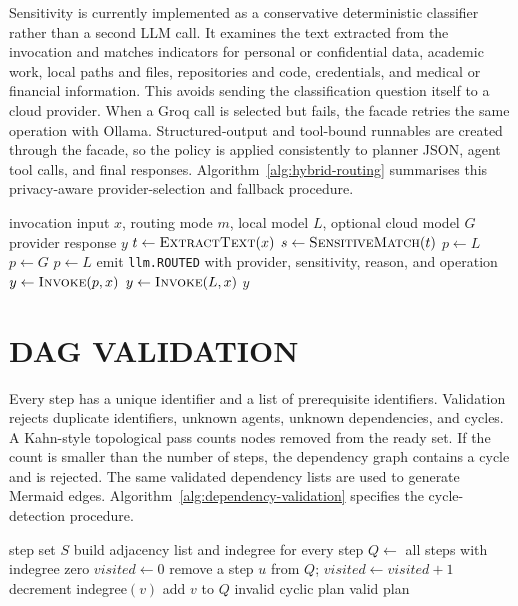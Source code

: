 Sensitivity is currently implemented as a conservative deterministic classifier rather than a second LLM call. It examines the text extracted from the invocation and matches indicators for personal or confidential data, academic work, local paths and files, repositories and code, credentials, and medical or financial information. This avoids sending the classification question itself to a cloud provider. When a Groq call is selected but fails, the facade retries the same operation with Ollama. Structured-output and tool-bound runnables are created through the facade, so the policy is applied consistently to planner JSON, agent tool calls, and final responses. Algorithm~\ref{alg:hybrid-routing} summarises this privacy-aware provider-selection and fallback procedure.

\begin{algorithm}[H]
\caption{Privacy-Aware Hybrid LLM Routing}
\label{alg:hybrid-routing}
\begin{algorithmic}[1]
\Require invocation input $x$, routing mode $m$, local model $L$, optional cloud model $G$
\Ensure provider response $y$
\State $t \gets \Call{ExtractText}{x}$
\State $s \gets \Call{SensitiveMatch}{t}$
    \State $p \gets L$
    \State $p \gets G$
\Else
    \State $p \gets L$
\EndIf
\State emit \texttt{llm.ROUTED} with provider, sensitivity, reason, and operation
\State $y \gets \Call{Invoke}{p,x}$
    \State $y \gets \Call{Invoke}{L,x}$
\EndIf
\State \Return $y$
\end{algorithmic}
\end{algorithm}
\section{\uppercase{DAG Validation}}
Every step has a unique identifier and a list of prerequisite identifiers. Validation rejects duplicate identifiers, unknown agents, unknown dependencies, and cycles. A Kahn-style topological pass counts nodes removed from the ready set. If the count is smaller than the number of steps, the dependency graph contains a cycle and is rejected. The same validated dependency lists are used to generate Mermaid edges. Algorithm~\ref{alg:dependency-validation} specifies the cycle-detection procedure.

\begin{algorithm}[H]
\caption{Dependency Validation by Cycle Detection}
\label{alg:dependency-validation}
\begin{algorithmic}[1]
\Require step set $S$
\State build adjacency list and indegree for every step
\State $Q \gets$ all steps with indegree zero
\State $visited \gets 0$
\State remove a step $u$ from $Q$; $visited \gets visited+1$
\State decrement indegree$(v)$
 add $v$ to $Q$ \EndIf
\EndFor
\EndWhile
{} \Return invalid cyclic plan \Else \Return valid plan \EndIf
\end{algorithmic}
\end{algorithm}


